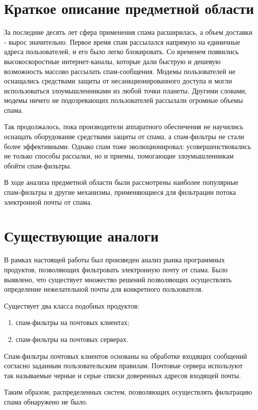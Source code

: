 \section{Краткое описание предметной области}
За последние десять лет сфера применения спама расширилась, а объем доставки - вырос значительно. Первое время спам рассылался напрямую на единичные адреса пользователей, и его было легко блокировать. Со временем появились высокоскоростные интернет-каналы, которые дали быструю и дешевую возможность массово рассылать спам-сообщения. Модемы пользователей не оснащались средствами защиты от несанкционированного доступа и могли использоваться злоумышленниками из любой точки планеты. Другими словами, модемы ничего не подозревающих пользователей рассылали огромные объемы спама.

Так продолжалось, пока производители аппаратного обеспечения не научились оснащать оборудование средствами защиты от спама, а спам-фильтры не стали более эффективными. Однако спам тоже эволюционировал: усовершенствовались не только способы рассылки, но и приемы, помогающие злоумышленникам обойти спам-фильтры. 

В ходе анализа предметной области были рассмотрены наиболее популярные спам-фильтры и другие механизмы, применяющиеся для фильтрации потока электронной почты от спама.


\section{Существующие аналоги}
В рамках настоящей работы был произведен анализ рынка программных продуктов, позволяющих фильтровать электронную почту от спама. Было выявлено, что существует множество решений позволяющих осуществлять определение нежелательной почты для конкретного пользователя. 

Существует два класса подобных продуктов:
\begin{enumerate}
	\item спам-фильтры на почтовых клиентах;
	\item спам-фильтры на почтовых серверах. 
\end{enumerate}

Спам-фильтры почтовых клиентов основаны на обработке входящих сообщений согласно заданным пользовательским правилам.  Почтовые сервера используют так называемые черные и серые списки доверенных адресов входящей почты.

Таким образом, распределенных систем, позволяющих осуществлять фильтрацию спама обнаружено не было.


